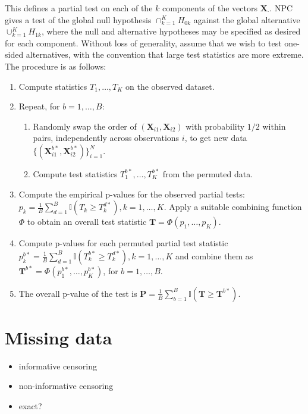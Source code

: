 \documentclass[12pt]{article}
\newcommand{\ind}{\mathbb{I}} %
\begin{document}
This defines a partial test on each of the $k$ components of the vectors $\mathbf{X}_{\cdot}$.
NPC gives a test of the global null hypothesis $\cap_{k=1}^K H_{0k}$ against the global alternative $\cup_{k=1}^K H_{1k}$,
where the null and alternative hypotheses may be specified as desired for each component.
Without loss of generality, assume that we wish to test one-sided alternatives, with the convention that large test statistics are more extreme.
The procedure is as follows:
\begin{enumerate}
\item Compute statistics $T_1, \dots, T_K$ on the observed dataset.
\item Repeat, for $b = 1, \dots, B$:
\begin{enumerate}
\item Randomly swap the order of $(\mathbf{X}_{i1}, \mathbf{X}_{i2})$ with probability $1/2$ within pairs, independently across observations $i$, 
to get new data $\{ (\mathbf{X}_{i1}^{b*}, \mathbf{X}_{i2}^{b*}) \}_{i=1}^N$.
\item Compute test statistics $T_1^{b*}, \dots, T_K^{b*}$ from the permuted data.
\end{enumerate}
\item Compute the empirical p-values for the observed partial tests: $p_k = \frac{1}{B}\sum_{d=1}^B \ind{(T_k \geq T_k^{d*})}, k = 1, \dots, K$.
Apply a suitable combining function $\Phi$ to obtain an overall test statistic $\mathbf{T} = \Phi(p_1, \dots, p_K)$.
\item Compute p-values for each permuted partial test statistic $p_{k}^{b*} = \frac{1}{B}\sum_{d=1}^B \ind{(T_k^{b*} \geq T_k^{d*})}, k = 1, \dots, K$ and combine them as $\mathbf{T}^{b*} = \Phi(p_1^{b*}, \dots, p_K^{b*})$, for $b = 1, \dots, B$.
\item The overall p-value of the test is $\mathbf{P} = \frac{1}{B} \sum_{b=1}^B \ind{(\mathbf{T} \geq \mathbf{T}^{b*})}$.
\end{enumerate}




\section{Missing data}
\begin{itemize}
\item informative censoring
\item non-informative censoring
\item exact?
\end{itemize}



\end{document}
